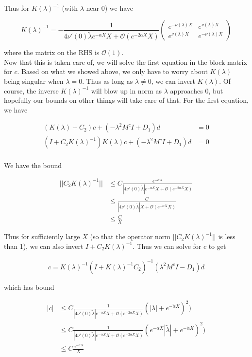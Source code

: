 \documentclass[12pt]{article}
\begin{document}
Thus for $K(\lambda)^{-1}$ (with $\lambda$ near 0) we have

\begin{equation}
K(\lambda)^{-1} = 
-\frac{1}{4 \nu'(0)\tilde{\lambda}e^{-\alpha X}X + \mathcal{O}(e^{-2 \alpha X}X)}
\begin{pmatrix}
e^{-\nu(\lambda)X} & e^{\nu(\lambda)X} \\
e^{\nu(\lambda)X} & e^{-\nu(\lambda)X}
\end{pmatrix}
\end{equation}

where the matrix on the RHS is $\mathcal{O}(1)$.\\

Now that this is taken care of, we will solve the first equation in the block matrix for $c$. Based on what we showed above, we only have to worry about $K(\lambda)$ being singular when $\lambda = 0$. Thus as long as $\lambda \neq 0$, we can invert $K(\lambda)$. Of course, the inverse $K(\lambda)^{-1}$ will blow up in norm as $\lambda$ approaches 0, but hopefully our bounds on other things will take care of that. For the first equation, we have

\begin{align*}
(K(\lambda) + C_2)c + (-\lambda^2 M^c I + D_1)d &= 0 \\
(I + C_2 K(\lambda)^{-1} )K(\lambda)c + (-\lambda^2 M^c I + D_1)d &= 0 \\
\end{align*}

We have the bound

\begin{align*}
|| C_2 K(\lambda)^{-1} || &\leq C \frac{ e^{-\alpha X} }{|4 \nu'(0)\tilde{\lambda}|e^{-\alpha X}X + \mathcal{O}(e^{-2 \alpha X}X)} \\
&\leq \frac{C}{|4 \nu'(0)\tilde{\lambda}| X + \mathcal{O}(e^{-\alpha X}X) } \\
&\leq \frac{C}{X}
\end{align*}

Thus for sufficiently large $X$ (so that the operator norm $|| C_2 K(\lambda)^{-1} ||$ is less than 1), we can also invert $I + C_2 K(\lambda)^{-1}$. Thus we can solve for $c$ to get

\begin{align*}
c = K(\lambda)^{-1} (I + K(\lambda)^{-1} C_2 )^{-1}( \lambda^2 M^c I - D_1)d 
\end{align*}

which has bound

\begin{align*}
|c| &\leq C \frac{ 1 }{|4 \nu'(0)\tilde{\lambda}|e^{-\alpha X}X + \mathcal{O}(e^{-2 \alpha X}X)} (|\lambda| + e^{-\tilde{\alpha} X})^2) \\
&\leq C \frac{ 1 }{|4 \nu'(0)\tilde{\lambda}|e^{-\alpha X}X + \mathcal{O}(e^{-2 \alpha X}X)} (e^{-\alpha X}|\tilde{\lambda}| + e^{-\tilde{\alpha} X})^2) \\
&\leq C \frac{ e^{-\alpha X} }{X}
\end{align*}
\end{document}
